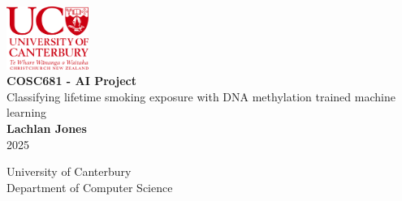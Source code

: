 \documentclass[draft]{article} %
\begin{document}
\doublespacing

\begin{titlepage}
    \centering
    \singlespacing
    \vspace*{1cm}

    \includegraphics[width=0.2\textwidth]{University_of_Canterbury_logo.svg.png}\\[1.5cm]

    \Huge
    \textbf{COSC681 - AI Project}\\[1.5cm]

    \LARGE
    Classifying lifetime smoking exposure with DNA methylation trained machine learning\\[2.5cm]

    \Large
    \textbf{Lachlan Jones}\\[0.5cm]
    2025\\[2.5cm]



    \vfill

    \Large
    University of Canterbury\\
    Department of Computer Science
\end{titlepage}

\end{document}

